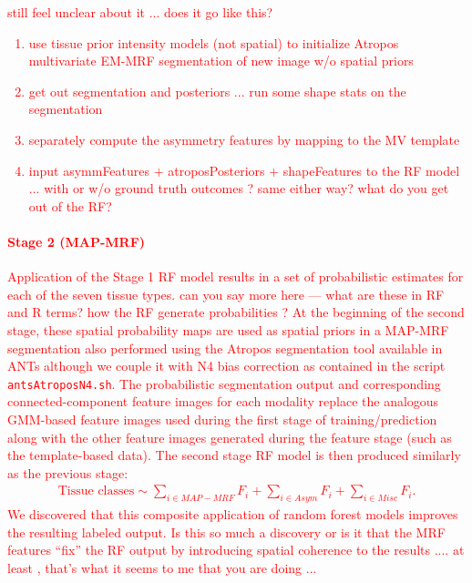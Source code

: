 \documentclass[preprint,authoryear,review,12pt]{elsarticle}
\begin{document}
\textcolor{red}{still feel unclear about it ...  does it go like this?
\begin{enumerate}
\item use tissue prior intensity models (not spatial) to initialize
  Atropos multivariate EM-MRF segmentation of new image  w/o spatial
  priors 
\item get out segmentation and posteriors ... run some shape stats on
  the segmentation 
\item separately compute the asymmetry features by mapping to the MV
  template 
\item input  asymmFeatures + atroposPosteriors + shapeFeatures to the
  RF model  ... with or w/o ground truth outcomes ?  same either way?
  what do you get out of the RF?
\end{enumerate}

\paragraph{Stage 2 (MAP-MRF)}

Application of the Stage 1 RF model results in a set of
probabilistic estimates for each of the seven tissue types.  
\textcolor{red}{can you say more here --- what are these in RF and R
  terms?  how the RF generate probabilities ?}
At the beginning of the second stage, these spatial probability maps are 
used as spatial priors in a 
MAP-MRF segmentation also performed using the Atropos 
segmentation tool \citep{avants2011} available in ANTs although we couple
it with N4 bias correction \citep{tustison2010} as contained in the script
{\tt antsAtroposN4.sh}.  The probabilistic segmentation output and corresponding
connected-component feature images for each modality replace the analogous 
GMM-based feature images used 
during the first stage of training/prediction along with the other feature
images generated during the feature stage (such as the template-based data).
The second stage RF model is then produced similarly as the previous stage: 
\begin{align}
\label{eq:mapmrf}
\mathrm{Tissue}\,\,\mathrm{classes} \sim \sum_{i \in MAP-MRF} F_i + \sum_{i \in Asym} F_i + \sum_{i \in Misc} F_i.
\end{align}
We discovered that this composite application of random
forest models improves the resulting labeled output.
\textcolor{red}{Is this so much a discovery or is it that the MRF
  features ``fix'' the RF output by introducing spatial coherence to
  the results .... at least , that's what it seems to me that you are
  doing ...}


}
\end{document}
